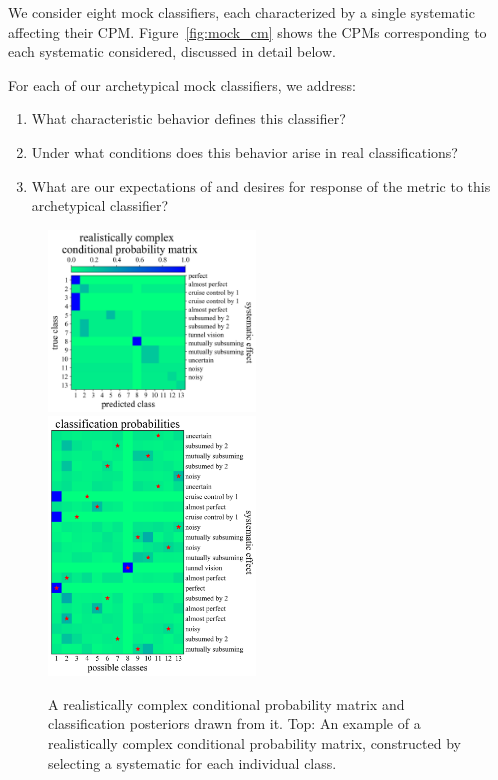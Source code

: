 We consider eight mock classifiers, each characterized by a single systematic affecting their CPM.
Figure~\ref{fig:mock_cm} shows the CPMs corresponding to each systematic considered, discussed in detail below.

For each of our archetypical mock classifiers, we address:
\begin{enumerate}
  \item What characteristic behavior defines this classifier?
  \item Under what conditions does this behavior arise in real classifications?
  \item What are our expectations of and desires for response of the metric to this archetypical classifier?
\end{enumerate}

\begin{figure}
	\begin{center}
		\includegraphics[width=0.49\textwidth]{./fig/combined.png}\\
    \includegraphics[width=0.49\textwidth]{./fig/examples.png}
		\caption{A realistically complex conditional probability matrix and classification posteriors drawn from it.
		Top: An example of a realistically complex conditional probability matrix, constructed by selecting a systematic for each individual class.
}
\end{center}
\end{figure}

